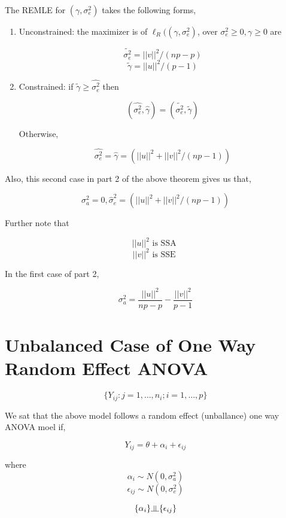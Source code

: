 \documentclass[11pt,fleqn]{book} %
\newcommand{\indep}{\rotatebox[origin=c]{90}{$\models$}}
\begin{document}
\begin{theorem}
	The REMLE for $(\gamma, \sigma_e^2)$ takes the following forms, 

			\begin{enumerate}
				\item Unconstrained: the maximizer is of $\ell_R((\gamma, \sigma_e^2)$, over $\sigma_e^2 \geq 0, \gamma \geq 0$ are

						$$\tilde{\sigma_e^2} = ||v||^2/(np - p) $$ 
						$$\tilde{\gamma} = ||u||^2 / (p - 1) $$
				\item Constrained: if $\tilde{\gamma} \geq \hat{\sigma_e^2}$ then 

						$$(\hat{\sigma_e^2}, \hat{\gamma}) = (\tilde{\sigma_e^2}, \tilde{\gamma})$$

				Otherwise, 

						$$ \hat{\sigma_e^2} = \hat{\gamma} = (||u||^2 + ||v||^2/ (np-1)) $$

			\end{enumerate}
\end{theorem}


Also, this second case in part 2 of the above theorem gives us that, 
		
		$$\sigma_a^2 = 0, \hat{\sigma}_e^2  =(||u||^2 + ||v||^2/ (np-1)) $$

Further note that 

		$$||u||^2 \text{ is SSA } $$
		$$||v||^2 \text{ is SSE } $$

In the first case of part 2, 

		$$\sigma_a^2 = \frac{||u||^2}{np - p} - \frac{||v||^2}{ p - 1} $$

\section{Unbalanced Case of One Way Random Effect ANOVA}


		$$\{Y_{ij}: j = 1, \dots, n_i; i = 1, \dots,  p\} $$

\begin{definition}
	We sat that the above model follows a random effect (unballance) one way ANOVA moel if, 

			$$Y_{ij} = \theta + \alpha_i + \epsilon_{ij} $$

where
			$$\alpha_i \sim N(0, \sigma_a^2) $$
			$$\epsilon_{ij} \sim N(0, \sigma_e^2) $$


			$$\{\alpha_i\} \indep \{\epsilon_{ij}\} $$

\end{definition}
\end{document}
